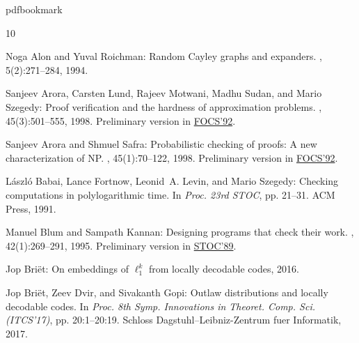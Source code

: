 \documentclass[11pt]{article}
\numberwithin{equation}{section}
\theoremstyle{definition}
\theoremstyle{plain}
\begin{document}
\providecommand{\bibhead}[1]{}
\expandafter\ifx\csname pdfbookmark\endcsname\relax%
  \providecommand{\tocrefpdfbookmark}{}
\else\providecommand{\tocrefpdfbookmark}{%
   \hypertarget{tocreferences}{}%
   \pdfbookmark[1]{References}{tocreferences}}%
\fi

\tocrefpdfbookmark
\begin{thebibliography}{10}

\bibhead{Alon:1994a}
{\sc Noga Alon and Yuval Roichman}: Random {C}ayley graphs and expanders.
, 5(2):271--284, 1994.

\bibhead{ALMSS98}
{\sc Sanjeev Arora, Carsten Lund, Rajeev Motwani, Madhu Sudan, and Mario
  Szegedy}: Proof verification and the hardness of approximation problems.
, 45(3):501--555, 1998.
\newblock Preliminary version in
  \href{https://ieeexplore.ieee.org/document/267823}{FOCS'92}.
\newblock [\epfmtdoi{10.1145/278298.278306}]

\bibhead{AS98}
{\sc Sanjeev Arora and Shmuel Safra}: Probabilistic checking of proofs: {A} new
  characterization of {NP}.
, 45(1):70--122, 1998.
\newblock Preliminary version in
  \href{https://ieeexplore.ieee.org/document/267824}{FOCS'92}.
\newblock [\epfmtdoi{10.1145/273865.273901}]

\bibhead{bfls}
{\sc L{\'a}szl{\'o} Babai, Lance Fortnow, Leonid~A. Levin, and Mario Szegedy}:
  Checking computations in polylogarithmic time.
\newblock In {\em Proc. 23rd STOC}, pp. 21--31. ACM Press, 1991.
\newblock [\epfmtdoi{10.1145/103418.103428}]

\bibhead{BK95}
{\sc Manuel Blum and Sampath Kannan}: Designing programs that check their work.
, 42(1):269--291, 1995.
\newblock Preliminary version in
  \href{https://doi.org/10.1145/73007.73015}{STOC'89}.
\newblock [\epfmtdoi{10.1145/200836.200880}]

\bibhead{Briet:2015}
{\sc Jop Bri\"{e}t}: On embeddings of $\ell_1^k$ from locally decodable codes,
  2016.

\bibhead{BDG_ITCS:2017}
{\sc Jop Bri\"{e}t, Zeev Dvir, and Sivakanth Gopi}: Outlaw distributions and
  locally decodable codes.
\newblock In {\em Proc. 8th Symp. Innovations in Theoret. Comp. Sci.
  (ITCS'17)}, pp. 20:1--20:19. Schloss Dagstuhl--Leibniz-Zentrum fuer
  Informatik, 2017.


\end{thebibliography}
\end{document}
